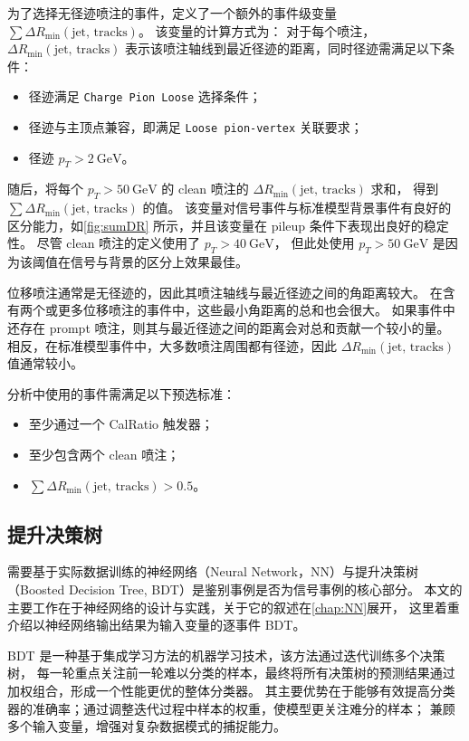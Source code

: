 为了选择无径迹喷注的事件，定义了一个额外的事件级变量 $\sum \Delta R_{\text{min}}(\text{jet, tracks})$。
该变量的计算方式为：
对于每个喷注，\(\Delta R_{\text{min}}(\text{jet, tracks})\) 表示该喷注轴线到最近径迹的距离，同时径迹需满足以下条件：
\begin{itemize}
    \item 径迹满足 \texttt{Charge Pion Loose} 选择条件；
    \item 径迹与主顶点兼容，即满足 \texttt{Loose pion-vertex} 关联要求；
    \item 径迹 \(p_T > 2~\text{GeV}\)。
\end{itemize}
随后，将每个 \(p_T > 50~\text{GeV}\) 的 clean 喷注的 \(\Delta R_{\text{min}}(\text{jet, tracks})\) 求和，
得到 \(\sum \Delta R_{\text{min}}(\text{jet, tracks})\) 的值。
该变量对信号事件与标准模型背景事件有良好的区分能力，如\autoref{fig:sumDR} 所示，并且该变量在 pileup 条件下表现出良好的稳定性。
尽管 clean 喷注的定义使用了 \(p_T > 40~\text{GeV}\)，
但此处使用 \(p_T > 50~\text{GeV}\) 是因为该阈值在信号与背景的区分上效果最佳。

位移喷注通常是无径迹的，因此其喷注轴线与最近径迹之间的角距离较大。
在含有两个或更多位移喷注的事件中，这些最小角距离的总和也会很大。
如果事件中还存在 prompt 喷注，则其与最近径迹之间的距离会对总和贡献一个较小的量。
相反，在标准模型事件中，大多数喷注周围都有径迹，因此 \(\Delta R_{\text{min}}(\text{jet, tracks})\) 值通常较小。

分析中使用的事件需满足以下预选标准：
\begin{itemize}
    \item 至少通过一个 CalRatio 触发器；
    \item 至少包含两个 clean 喷注；
    \item \(\sum \Delta R_{\text{min}}(\text{jet, tracks}) > 0.5\)。
\end{itemize}


\subsection{提升决策树}
\label{sec:BDT}

需要基于实际数据训练的神经网络（Neural Network，NN）与提升决策树（Boosted Decision Tree, BDT）是鉴别事例是否为信号事例的核心部分。
本文的主要工作在于神经网络的设计与实践，关于它的叙述在\autoref{chap:NN}展开，
这里着重介绍以神经网络输出结果为输入变量的逐事件 BDT。

BDT 是一种基于集成学习方法的机器学习技术，该方法通过迭代训练多个决策树，
每一轮重点关注前一轮难以分类的样本，最终将所有决策树的预测结果通过加权组合，形成一个性能更优的整体分类器。
其主要优势在于能够有效提高分类器的准确率；通过调整迭代过程中样本的权重，使模型更关注难分的样本；
兼顾多个输入变量，增强对复杂数据模式的捕捉能力。

